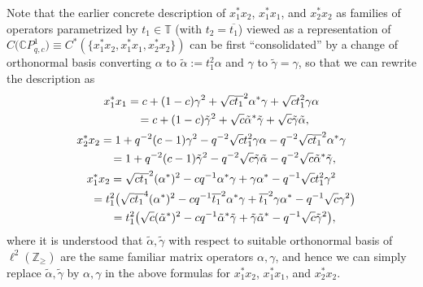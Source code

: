 \documentclass[pdftex]{sigma}
\begin{document}
Note that the earlier concrete description of $x_{1}^{\ast}x_{2}$,
$x_{1}^{\ast}x_{1}$, and $x_{2}^{\ast}x_{2}$ as families of operators
parametrized by $t_{1}\in\mathbb{T}$ (with $t_{2}=\overline{t_{1}}$) viewed as
a representation of $C\big(\mathbb{C}P_{q,c}^{1}\big) \equiv C^{\ast
} ( \{ x_{1}^{\ast}x_{2},x_{1}^{\ast}x_{1},\allowbreak x_{2}^{\ast}
x_{2} \} ) $ can be first ``consolidated'' by a change of orthonormal basis converting
$\alpha$ to $\tilde{\alpha}:=t_{1}^{2}\alpha$ and $\gamma$ to $\tilde{\gamma
}=\gamma$, so that we can rewrite the description as
\begin{gather*}
x_{1}^{\ast}x_{1} =c+(1-c) \gamma^{2}+\sqrt{c}%
\overline{t_{1}}^{2}\alpha^{\ast}\gamma+\sqrt{c}t_{1}^{2}\gamma\alpha\\
\hphantom{x_{1}^{\ast}x_{1}}{} =c+(1-c) \tilde{\gamma}^{2}+\sqrt{c}\tilde{\alpha}^{\ast
}\tilde{\gamma}+\sqrt{c}\tilde{\gamma}\tilde{\alpha},
\\
x_{2}^{\ast}x_{2} =1+q^{-2}(c-1) \gamma^{2}-q^{-2}\sqrt
{c}t_{1}^{2}\gamma\alpha-q^{-2}\sqrt{c}\overline{t_{1}}^{2}\alpha^{\ast}%
\gamma\\
\hphantom{x_{2}^{\ast}x_{2}}{} =1+q^{-2}(c-1) \tilde{\gamma}^{2}-q^{-2}\sqrt{c}\tilde
{\gamma}\tilde{\alpha}-q^{-2}\sqrt{c}\tilde{\alpha}^{\ast}\tilde{\gamma},
\\
x_{1}^{\ast}x_{2} =\sqrt{c}\overline{t_{1}}^{2} ( \alpha^{\ast
} ) ^{2}-cq^{-1}\alpha^{\ast}\gamma+\gamma\alpha^{\ast}-q^{-1}\sqrt
{c}t_{1}^{2}\gamma^{2}\\
\hphantom{x_{1}^{\ast}x_{2}}{}
 =t_{1}^{2}\big( \sqrt{c}\overline{t_{1}}^{4} ( \alpha^{\ast} )
^{2}-cq^{-1}\overline{t_{1}}^{2}\alpha^{\ast}\gamma+\overline{t_{1}}^{2}%
\gamma\alpha^{\ast}-q^{-1}\sqrt{c}\gamma^{2}\big) \\
\hphantom{x_{1}^{\ast}x_{2}}{} =t_{1}^{2}\big( \sqrt{c} ( \tilde{\alpha}^{\ast} )
^{2}-cq^{-1}\tilde{\alpha}^{\ast}\tilde{\gamma}+\tilde{\gamma}\tilde{\alpha
}^{\ast}-q^{-1}\sqrt{c}\tilde{\gamma}^{2}\big) ,
\end{gather*}
where it is understood that $\tilde{\alpha},\tilde{\gamma}$ with respect to
suitable orthonormal basis of $\ell^{2} ( \mathbb{Z}_{\geq} ) $ are
the same familiar matrix operators $\alpha,\gamma$, and hence we can simply
replace $\tilde{\alpha},\tilde{\gamma}$ by $\alpha,\gamma$ in the above
formulas for $x_{1}^{\ast}x_{2}$, $x_{1}^{\ast}x_{1}$, and $x_{2}^{\ast}x_{2}$.
\end{document}
